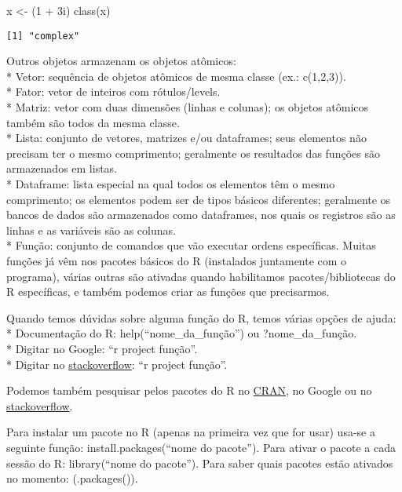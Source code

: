 \documentclass[
  letterpaper,
  DIV=11,
  numbers=noendperiod]{scrreprt}
\newenvironment{Shaded}{\begin{snugshade}}{\end{snugshade}}
\newcommand{\DecValTok}[1]{\textcolor[rgb]{0.68,0.00,0.00}{#1}}
\newcommand{\FunctionTok}[1]{\textcolor[rgb]{0.28,0.35,0.67}{#1}}
\newcommand{\NormalTok}[1]{\textcolor[rgb]{0.00,0.23,0.31}{#1}}
\newcommand{\OtherTok}[1]{\textcolor[rgb]{0.00,0.23,0.31}{#1}}
\newcommand{\SpecialCharTok}[1]{\textcolor[rgb]{0.37,0.37,0.37}{#1}}
\begin{document}
\begin{Shaded}
\begin{Highlighting}[]
\NormalTok{x }\OtherTok{\textless{}{-}}\NormalTok{ (}\DecValTok{1} \SpecialCharTok{+} \DecValTok{3}\NormalTok{i)  }
\FunctionTok{class}\NormalTok{(x)}
\end{Highlighting}
\end{Shaded}

\begin{verbatim}
[1] "complex"
\end{verbatim}

Outros objetos armazenam os objetos atômicos:\\
* Vetor: sequência de objetos atômicos de mesma classe (ex.:
c(1,2,3)).\\
* Fator: vetor de inteiros com rótulos/levels.\\
* Matriz: vetor com duas dimensões (linhas e colunas); os objetos
atômicos também são todos da mesma classe.\\
* Lista: conjunto de vetores, matrizes e/ou dataframes; seus elementos
não precisam ter o mesmo comprimento; geralmente os resultados das
funções são armazenados em listas.\\
* Dataframe: lista especial na qual todos os elementos têm o mesmo
comprimento; os elementos podem ser de tipos básicos diferentes;
geralmente os bancos de dados são armazenados como dataframes, nos quais
os registros são as linhas e as variáveis são as colunas.\\
* Função: conjunto de comandos que vão executar ordens específicas.
Muitas funções já vêm nos pacotes básicos do R (instalados juntamente
com o programa), várias outras são ativadas quando habilitamos
pacotes/bibliotecas do R específicas, e também podemos criar as funções
que precisarmos.

Quando temos dúvidas sobre alguma função do R, temos várias opções de
ajuda:\\
* Documentação do R: help(``nome\_da\_função'') ou ?nome\_da\_função.\\
* Digitar no Google: ``r project função''.\\
* Digitar no \href{https://stackoverflow.com/}{stackoverflow}: ``r
project função''.

Podemos também pesquisar pelos pacotes do R no
\href{https://cran.r-project.org/}{CRAN}, no Google ou no
\href{https://stackoverflow.com/}{stackoverflow}.

Para instalar um pacote no R (apenas na primeira vez que for usar)
usa-se a seguinte função: install.packages(``nome do pacote''). Para
ativar o pacote a cada sessão do R: library(``nome do pacote''). Para
saber quais pacotes estão ativados no momento: (.packages()).
\end{document}
